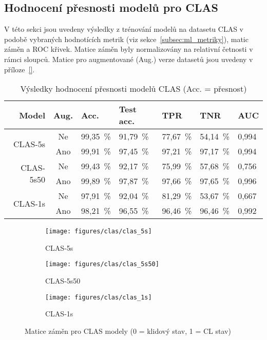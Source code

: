 \subsection{Hodnocení přesnosti modelů pro CLAS}
\label{subsec:clas_models}
V této sekci jsou uvedeny výsledky z trénování modelů na datasetu CLAS v podobě
vybraných hodnotících metrik (viz sekce~\ref{subsec:ml_metriky}), matic záměn a
ROC křivek. Matice záměn byly normalizovány na relativní četnosti v rámci
sloupců. Matice pro augmentované (Aug.) verze datasetů jsou uvedeny v
příloze~\ref{}.

\begin{table}[h]
    \small
    \centering
    \caption{Výsledky hodnocení přesnosti modelů CLAS (Acc. = přesnost)}
    \begin{tabular*}{\linewidth}{@{\extracolsep{\fill}} r|c|lllll @{}}
        \toprule
        Model                      & Aug. & Acc.     & Test acc. & TPR      & TNR      & AUC   \\ \midrule
        \multirow{2}{*}{CLAS-5s}   & Ne   & 99,35~\% & 91,79~\%  & 77,67~\% & 54,14~\% & 0,994 \\
        & Ano  & 99,91~\% & 97,45~\%  & 97,21~\% & 97,17~\% & 0,994 \\ \midrule
        \multirow{2}{*}{CLAS-5s50} & Ne   & 99,43~\% & 92,17~\%  & 75,99~\% & 57,68~\% & 0,756 \\
        & Ano  & 99,89~\% & 97,87~\%  & 97,66~\% & 97,65~\% & 0,996 \\ \midrule
        \multirow{2}{*}{CLAS-1s}   & Ne   & 97,91~\% & 92,04~\%  & 81,29~\% & 53,67~\% & 0,667 \\
        & Ano  & 98,21~\% & 96,55~\%  & 96,46~\% & 96,46~\% & 0,992 \\
        \bottomrule
    \end{tabular*}
    \label{tab:clas_eval}
\end{table}

\begin{figure}[!htb]
    \centering
    \begin{subfigure}[h]{0.32\linewidth}
        \texttt{[image: figures/clas/clas\_5s]}
        \caption{CLAS-5s}
    \end{subfigure}
    \hspace{0.05cm}
    \begin{subfigure}[h]{0.32\linewidth}
        \texttt{[image: figures/clas/clas\_5s50]}
        \caption{CLAS-5s50}
    \end{subfigure}
    \hspace{0.05cm}
    \begin{subfigure}[h]{0.32\linewidth}
        \texttt{[image: figures/clas/clas\_1s]}
        \caption{CLAS-1s}
    \end{subfigure}
    \caption{Matice záměn pro CLAS modely (0 = klidový stav, 1 = CL stav)}
    \label{fig:results_cm_clas}
\end{figure}

